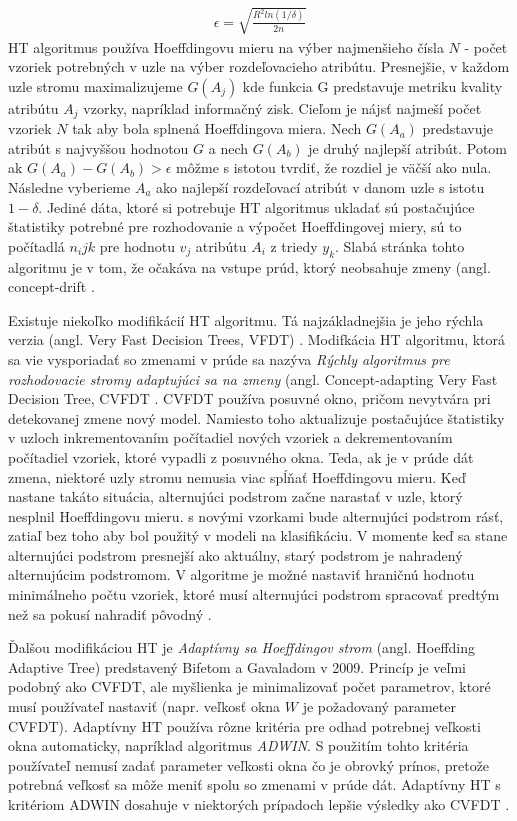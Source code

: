 \begin{align*}
\epsilon = \sqrt{ \frac{R^2ln(1/\delta)} {2n} }
\end{align*}
HT algoritmus používa Hoeffdingovu mieru na výber najmenšieho čísla $N$ - počet vzoriek potrebných v uzle na výber rozdeľovacieho atribútu. Presnejšie, v každom uzle stromu maximalizujeme $G(A_j)$ kde funkcia G predstavuje metriku kvality atribútu $A_j$ vzorky, napríklad informačný zisk. Cieľom je nájsť najmeší počet vzoriek $N$ tak aby bola splnená Hoeffdingova miera. Nech $G(A_a)$ predstavuje atribút s najvyššou hodnotou $G$ a nech $G(A_b)$ je druhý najlepší atribút. Potom ak $G(A_a) - G(A_b) > \epsilon$ môžme s istotou tvrdiť, že rozdiel je väčší ako nula. Následne vyberieme $A_a$ ako najlepší rozdeľovací atribút v danom uzle s istotu $1-\delta$. Jediné dáta, ktoré si potrebuje HT algoritmus ukladať sú postačujúce štatistiky potrebné pre rozhodovanie a výpočet Hoeffdingovej miery, sú to počítadlá $n_ijk$ pre hodnotu $v_j$ atribútu $A_i$ z triedy $y_k$. Slabá stránka tohto algoritmu je v tom, že očakáva na vstupe prúd, ktorý neobsahuje zmeny (angl. concept-drift \citep{domingos2000mining}.
\par %
Existuje niekoľko modifikácií HT algoritmu. Tá najzákladnejšia je jeho rýchla verzia (angl. Very Fast Decision Trees, VFDT) \citep{domingos2000mining}. Modifkácia HT algoritmu, ktorá sa vie vysporiadať so zmenami v prúde sa nazýva \textit{Rýchly algoritmus pre rozhodovacie stromy adaptujúci sa na zmeny} (angl. Concept-adapting Very Fast Decision Tree, CVFDT \citep{hulten2001mining}. CVFDT používa posuvné okno, pričom nevytvára pri detekovanej zmene nový model. Namiesto toho aktualizuje postačujúce štatistiky v uzloch inkrementovaním počítadiel nových vzoriek a dekrementovaním počítadiel vzoriek, ktoré vypadli z posuvného okna. Teda, ak je v prúde dát zmena, niektoré uzly stromu nemusia viac spĺňať Hoeffdingovu mieru. Keď nastane takáto situácia, alternujúci podstrom začne narastať v uzle, ktorý nesplnil Hoeffdingovu mieru. s novými vzorkami bude alternujúci podstrom rásť, zatiaľ bez toho aby bol použitý v modeli na klasifikáciu. V momente keď sa stane alternujúci podstrom presnejší ako aktuálny, starý podstrom je nahradený alternujúcim podstromom. V algoritme je možné nastaviť hraničnú hodnotu minimálneho počtu vzoriek, ktoré musí alternujúci podstrom spracovať predtým než sa pokusí nahradiť pôvodný \citep{hulten2001mining}.
\par
Ďalšou modifikáciou HT je \textit{Adaptívny sa Hoeffdingov strom} (angl. Hoeffding Adaptive Tree) predstavený Bifetom a Gavaladom v 2009. Princíp je veľmi podobný ako CVFDT, ale myšlienka je minimalizovať počet parametrov, ktoré musí používateľ nastaviť (napr. veľkosť okna $W$ je požadovaný parameter CVFDT). Adaptívny HT používa rôzne 	kritéria pre odhad potrebnej veľkosti okna automaticky, napríklad algoritmus \textit{ADWIN}. S použitím tohto kritéria používateľ nemusí zadať parameter veľkosti okna čo je obrovký prínos, pretože potrebná veľkosť sa môže meniť spolu so zmenami v prúde dát. Adaptívny HT s kritériom ADWIN dosahuje v niektorých prípadoch lepšie výsledky ako CVFDT \citep{bifet2009adaptive}.
